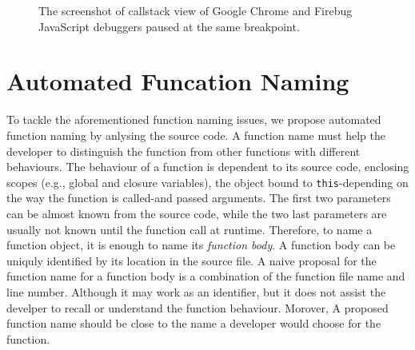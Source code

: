 \documentclass{acm_proc_article-sp}
\begin{document}
\begin{figure}[htp]
\centerline{
\hfil
{}}
\caption{The screenshot of callstack view of Google Chrome and Firebug JavaScript debuggers paused at the same breakpoint.}
\label{debuggers-callstack}
\end{figure}

\section{Automated Funcation Naming}
    To tackle the aforementioned function naming issues, we propose automated function naming by anlysing the source code. A function name must help the developer to
distinguish the function from other functions with different behaviours. The behaviour of a function is dependent to its source code, enclosing scopes (e.g., global and closure variables), the object bound to {\small\texttt{this}}-depending on the way the function is called-and passed arguments. The first two parameters can be almost known from the source code, while the two last parameters are usually not known until the function call at runtime. Therefore, to name a function object, it is enough to name its \textit{function body}. 
    A function body can be uniquly identified by its location in the source file. A naive proposal for the function name for a function body is a combination of the function file name and line number. Although it may work as an identifier, but it does not assist the develper to recall or understand the function behaviour. Morover, A proposed function name should be close to the name a developer would choose for the function. 
\end{document}

